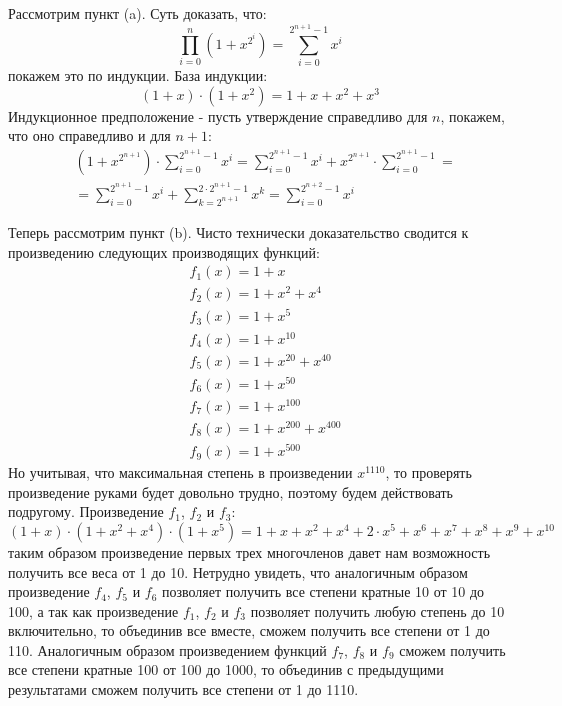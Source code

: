 \documentclass[a4paper,12pt]{article}
\begin{document}
\begin{Solution}
Рассмотрим пункт (a). Суть доказать, что:
\[
	\prod_{i=0}^{n}\left(1+x^{2^i}\right)=\sum_{i=0}^{2^{n+1}-1}x^i
\]
покажем это по индукции. База индукции:
\[
	\left(1+x\right)\cdot\left(1+x^2\right)=1+x+x^2+x^3
\]
Индукционное предположение - пусть утверждение справедливо для $n$, покажем, что оно справедливо и для $n+1$:
\[
	\begin{split}
		&\left(1+x^{2^{n+1}}\right)\cdot\sum_{i=0}^{2^{n+1}-1}x^i = \sum_{i=0}^{2^{n+1}-1}x^i + x^{2^{n+1}}\cdot\sum_{i=0}^{2^{n+1}-1} = \\
		&=\sum_{i=0}^{2^{n+1}-1}x^i+\sum_{k=2^{n+1}}^{2\cdot 2^{n+1}-1}x^k = \sum_{i=0}^{2^{n+2}-1}x^i
	\end{split}
\]

Теперь рассмотрим пункт (b). Чисто технически доказательство сводится к произведению следующих производящих функций:
\[
	\begin{split}
		&f_1\left(x\right) = 1+x\\
		&f_2\left(x\right) = 1+x^2+x^4\\
		&f_3\left(x\right) = 1+x^5\\
		&f_4\left(x\right) = 1+x^{10}\\
		&f_5\left(x\right) = 1+x^{20}+x^{40}\\
		&f_6\left(x\right) = 1+x^{50}\\
		&f_7\left(x\right) = 1+x^{100}\\
		&f_8\left(x\right) = 1+x^{200}+x^{400}\\
		&f_9\left(x\right) = 1+x^{500}
	\end{split}
\]
Но учитывая, что максимальная степень в произведении $x^{1110}$, то проверять произведение руками будет довольно трудно, поэтому будем действовать подругому.
Произведение $f_1$, $f_2$ и $f_3$:
\[
	\left(1+x\right)\cdot\left(1+x^2+x^4\right)\cdot\left(1+x^5\right) = 1+x+x^2+x^4+2\cdot x^5+x^6+x^7+x^8+x^9+x^{10}
\]
таким образом произведение первых трех многочленов давет нам возможность получить все веса от 1 до 10. Нетрудно увидеть, что аналогичным образом произведение $f_4$, $f_5$ и $f_6$ позволяет получить все степени кратные 10 от 10 до 100, а так как произведение $f_1$, $f_2$ и $f_3$ позволяет получить любую степень до 10 включительно, то объединив все вместе, сможем получить все степени от 1 до 110. Аналогичным образом произведением функций $f_7$, $f_8$ и $f_9$ сможем получить все степени кратные 100 от 100 до 1000, то объединив с предыдущими результатами сможем получить все степени от 1 до 1110.

\end{Solution}
\end{document}
